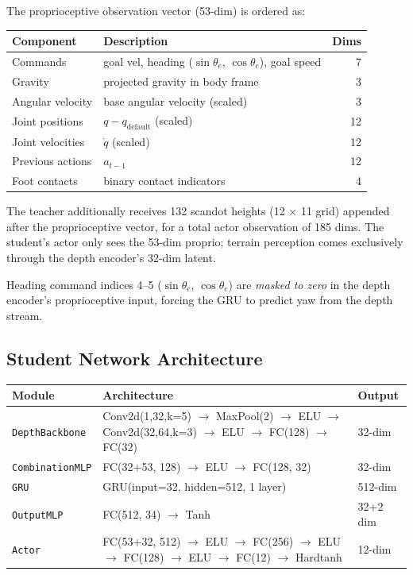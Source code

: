 \documentclass[11pt,a4paper]{article}
\begin{document}
The proprioceptive observation vector (53-dim) is ordered as:

\begin{center}
\begin{tabular}{llr}
\toprule
Component & Description & Dims \\
\midrule
Commands & goal vel, heading ($\sin\theta_e$, $\cos\theta_e$), goal speed & 7 \\
Gravity & projected gravity in body frame & 3 \\
Angular velocity & base angular velocity (scaled) & 3 \\
Joint positions & $q - q_{\mathrm{default}}$ (scaled) & 12 \\
Joint velocities & $\dot{q}$ (scaled) & 12 \\
Previous actions & $a_{t-1}$ & 12 \\
Foot contacts & binary contact indicators & 4 \\
\bottomrule
\end{tabular}
\end{center}

The teacher additionally receives 132 scandot heights (12 $\times$ 11 grid)
appended after the proprioceptive vector, for a total actor observation of 185
dims. The student's actor only sees the 53-dim proprio; terrain perception
comes exclusively through the depth encoder's 32-dim latent.

Heading command indices 4--5 ($\sin\theta_e$, $\cos\theta_e$) are
\emph{masked to zero} in the depth encoder's proprioceptive input, forcing the
GRU to predict yaw from the depth stream.

\subsection{Student Network Architecture}

\begin{center}
\begin{tabular}{lll}
\toprule
Module & Architecture & Output \\
\midrule
\texttt{DepthBackbone} & Conv2d(1,32,k=5) $\to$ MaxPool(2) $\to$ ELU
  $\to$ Conv2d(32,64,k=3) $\to$ ELU $\to$ FC(128) $\to$ FC(32) & 32-dim \\
\texttt{CombinationMLP} & FC(32+53, 128) $\to$ ELU $\to$ FC(128, 32) & 32-dim \\
\texttt{GRU} & GRU(input=32, hidden=512, 1 layer) & 512-dim \\
\texttt{OutputMLP} & FC(512, 34) $\to$ Tanh & 32+2 dim \\
\texttt{Actor} & FC(53+32, 512) $\to$ ELU $\to$ FC(256) $\to$ ELU
  $\to$ FC(128) $\to$ ELU $\to$ FC(12) $\to$ Hardtanh & 12-dim \\
\bottomrule
\end{tabular}
\end{center}
\end{document}
